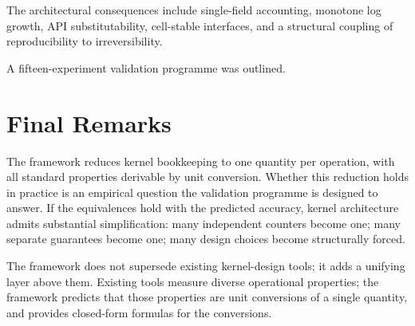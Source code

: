 \documentclass[twocolumn,11pt,a4paper]{article}
\begin{document}
The architectural consequences include single-field accounting, monotone log growth, API substitutability, cell-stable interfaces, and a structural coupling of reproducibility to irreversibility.

A fifteen-experiment validation programme was outlined.

\section{Final Remarks}

The framework reduces kernel bookkeeping to one quantity per operation, with all standard properties derivable by unit conversion. Whether this reduction holds in practice is an empirical question the validation programme is designed to answer. If the equivalences hold with the predicted accuracy, kernel architecture admits substantial simplification: many independent counters become one; many separate guarantees become one; many design choices become structurally forced.

The framework does not supersede existing kernel-design tools; it adds a unifying layer above them. Existing tools measure diverse operational properties; the framework predicts that those properties are unit conversions of a single quantity, and provides closed-form formulas for the conversions.



\end{document}
